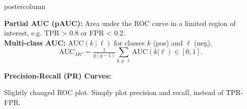 \documentclass{beamer}
\begin{document}
\begin{frame}[fragile]{}
\begin{columns}
\begin{column}{.31\textwidth}
\begin{beamercolorbox}[center]{postercolumn}
\begin{minipage}{.98\textwidth}
{\begin{myblock}{}
            \textbf{Partial AUC (pAUC):} Area under the ROC curve in a limited region of interest, e.g. TPR > 0.8 or FPR < 0.2.\\

\textbf{Multi-class AUC:} $\text{AUC}(k ~|~ \ell)$ for classes $k$ (pos) and $\ell$ (neg).
$$\text{AUC}_{MC} = \tfrac{1}{g(g - 1)} \sum_{k \neq \ell} \text{AUC}(k | \ell) \in [0, 1].$$

\begin{codebox}
  \textbf{Precision-Recall (PR) Curves: }
\end{codebox}
Slightly changed ROC plot. Simply plot precision and recall, instead of TPR-FPR.
  \end{myblock}
  }
  \end{minipage}
  \end{beamercolorbox}
  \end{column}

\end{columns}
\end{frame}
\end{document}
